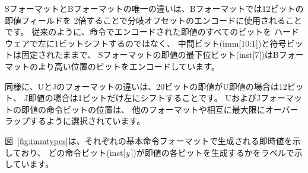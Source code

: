 \begin{comment}
The only difference between the S and B formats is that the 12-bit
immediate field is used to encode branch offsets in multiples of 2 in
the B format.  Instead of shifting all bits in the
instruction-encoded immediate left by one in hardware as is
conventionally done, the middle bits (imm[10:1]) and sign bit stay in
fixed positions, while the lowest bit in S format (inst[7]) encodes a
high-order bit in B format.
\end{comment}

SフォーマットとBフォーマットの唯一の違いは、Bフォーマットでは12ビットの即値フィールドを
2倍することで分岐オフセットのエンコードに使用されることです。 
従来のように、命令でエンコードされた即値のすべてのビットを
ハードウェアで左に1ビットシフトするのではなく、
中間ビット(imm[10:1])と符号ビットは固定されたままで、
Sフォーマットの即値の最下位ビット(inst[7])はBフォーマットのより高い位置のビットをエンコードしています。

\begin{comment}
Similarly, the only difference between the U and J formats is
that the 20-bit immediate is shifted left by 12 bits to form U
immediates and by 1 bit to form J immediates.  The location of
instruction bits in the U and J format immediates is chosen to
maximize overlap with the other formats and with each other.
\end{comment}

同様に、UとJのフォーマットの違いは、20ビットの即値がU即値の場合は12ビット、
J即値の場合は1ビットだけ左にシフトすることです。
UおよびJフォーマットの即値の命令ビットの位置は、
他のフォーマットや相互に最大限にオーバーラップするように選択されています。

\begin{comment}
Figure~\ref{fig:immtypes} shows the immediates produced by each of the
base instruction formats, and is labeled to show which instruction
bit (inst[{\em y}\,]) produces each bit of the immediate value.
\end{comment}

図~\ref{fig:immtypes}は、それぞれの基本命令フォーマットで生成される即時値を示しており、
どの命令ビット(inst[{\em y}\,])が即値の各ビットを生成するかをラベルで示しています。


